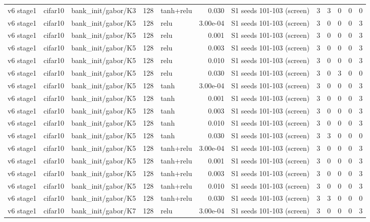 \begin{table}[htbp]
{\begin{tabular}{@{}lllrlrlrrrrr@{}}
v6 stage1 & cifar10 & bank\_init/gabor/K3 & 128 & tanh+relu & 0.030 & S1 seeds 101-103 (screen) & 3 & 3 & 0 & 0 & 0 \\
v6 stage1 & cifar10 & bank\_init/gabor/K5 & 128 & relu & 3.00e-04 & S1 seeds 101-103 (screen) & 3 & 0 & 0 & 0 & 3 \\
v6 stage1 & cifar10 & bank\_init/gabor/K5 & 128 & relu & 0.001 & S1 seeds 101-103 (screen) & 3 & 0 & 0 & 0 & 3 \\
v6 stage1 & cifar10 & bank\_init/gabor/K5 & 128 & relu & 0.003 & S1 seeds 101-103 (screen) & 3 & 0 & 0 & 0 & 3 \\
v6 stage1 & cifar10 & bank\_init/gabor/K5 & 128 & relu & 0.010 & S1 seeds 101-103 (screen) & 3 & 0 & 0 & 0 & 3 \\
v6 stage1 & cifar10 & bank\_init/gabor/K5 & 128 & relu & 0.030 & S1 seeds 101-103 (screen) & 3 & 0 & 3 & 0 & 0 \\
v6 stage1 & cifar10 & bank\_init/gabor/K5 & 128 & tanh & 3.00e-04 & S1 seeds 101-103 (screen) & 3 & 0 & 0 & 0 & 3 \\
v6 stage1 & cifar10 & bank\_init/gabor/K5 & 128 & tanh & 0.001 & S1 seeds 101-103 (screen) & 3 & 0 & 0 & 0 & 3 \\
v6 stage1 & cifar10 & bank\_init/gabor/K5 & 128 & tanh & 0.003 & S1 seeds 101-103 (screen) & 3 & 0 & 0 & 0 & 3 \\
v6 stage1 & cifar10 & bank\_init/gabor/K5 & 128 & tanh & 0.010 & S1 seeds 101-103 (screen) & 3 & 0 & 0 & 0 & 3 \\
v6 stage1 & cifar10 & bank\_init/gabor/K5 & 128 & tanh & 0.030 & S1 seeds 101-103 (screen) & 3 & 3 & 0 & 0 & 0 \\
v6 stage1 & cifar10 & bank\_init/gabor/K5 & 128 & tanh+relu & 3.00e-04 & S1 seeds 101-103 (screen) & 3 & 0 & 0 & 0 & 3 \\
v6 stage1 & cifar10 & bank\_init/gabor/K5 & 128 & tanh+relu & 0.001 & S1 seeds 101-103 (screen) & 3 & 0 & 0 & 0 & 3 \\
v6 stage1 & cifar10 & bank\_init/gabor/K5 & 128 & tanh+relu & 0.003 & S1 seeds 101-103 (screen) & 3 & 0 & 0 & 0 & 3 \\
v6 stage1 & cifar10 & bank\_init/gabor/K5 & 128 & tanh+relu & 0.010 & S1 seeds 101-103 (screen) & 3 & 0 & 0 & 0 & 3 \\
v6 stage1 & cifar10 & bank\_init/gabor/K5 & 128 & tanh+relu & 0.030 & S1 seeds 101-103 (screen) & 3 & 3 & 0 & 0 & 0 \\
v6 stage1 & cifar10 & bank\_init/gabor/K7 & 128 & relu & 3.00e-04 & S1 seeds 101-103 (screen) & 3 & 0 & 0 & 0 & 3 \\

\end{tabular}}
\end{table}
